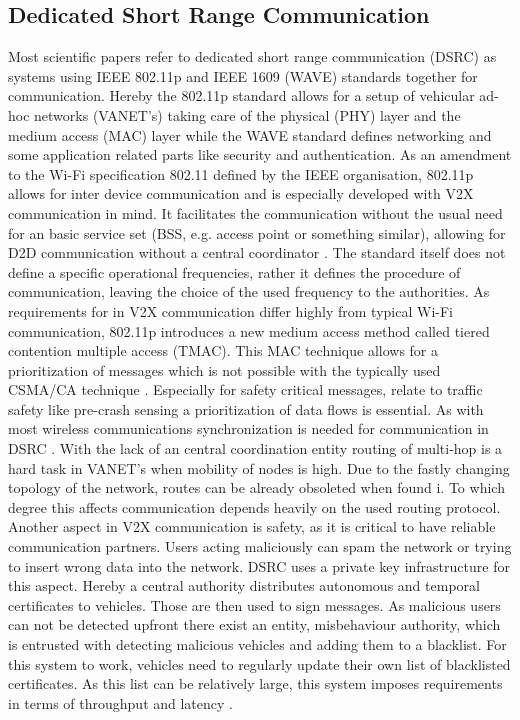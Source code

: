 \documentclass[conference,12pt,onecolumn]{IEEEtran}
\begin{document}
\subsection{Dedicated Short Range Communication}
Most scientific papers refer to dedicated short range communication (DSRC) as systems using IEEE 802.11p and  IEEE 1609 (WAVE) standards together for communication\cite{machardy2018}. Hereby the 802.11p standard allows for a setup of vehicular ad-hoc networks (VANET's) taking care of the physical (PHY) layer and the medium access (MAC) layer while the WAVE standard defines networking and some application related parts like security and authentication.
As an amendment to the Wi-Fi specification 802.11 defined by the IEEE organisation, 802.11p allows for inter device communication and is especially developed with V2X communication in mind. It facilitates the communication without the usual need for an basic service set (BSS, e.g. access point or something similar), allowing for D2D communication without a central coordinator \cite{machardy2018}. The standard itself does not define a specific operational frequencies, rather it defines the procedure of communication, leaving the choice of the used frequency to the authorities. As requirements for in V2X communication differ highly from typical Wi-Fi communication, 802.11p introduces a new medium access method called tiered contention multiple access (TMAC). This MAC technique allows for a prioritization of messages which is not possible with the typically used CSMA/CA technique \cite{machardy2018}. Especially for safety critical messages, relate to traffic safety like pre-crash sensing a prioritization of data flows is essential.
As with most wireless communications synchronization is needed for communication in DSRC \cite{kenney2011}. With the lack of an central coordination entity routing of multi-hop is a hard task in VANET's when mobility of nodes is high. Due to the fastly changing topology of the network, routes can be already obsoleted when found i\cite{machardy2018}. To which degree this affects communication depends heavily on the used routing protocol.
Another aspect in V2X communication is safety, as it is critical to have reliable communication partners. Users acting maliciously can spam the network or trying to insert wrong data into the network. DSRC uses a private key infrastructure for this aspect. Hereby a central authority distributes autonomous and temporal certificates to vehicles. Those are then used to sign messages. As malicious users can not be detected upfront there exist an entity, misbehaviour authority, which is entrusted with detecting malicious vehicles and adding them to a blacklist. For this system to work, vehicles need to regularly update their own list of blacklisted certificates. As this list can be relatively large, this system imposes requirements in terms of throughput and latency \cite{machardy2018}.
\end{document}
